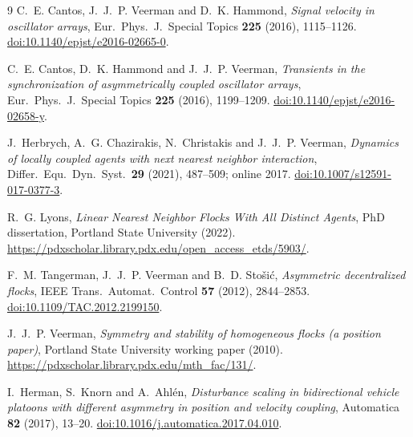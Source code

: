 \documentclass[11pt]{article}
\begin{document}
\begin{thebibliography}{9}
C.~E. Cantos, J.~J.~P. Veerman and D.~K. Hammond,
\emph{Signal velocity in oscillator arrays},
Eur.\ Phys.\ J.\ Special Topics \textbf{225} (2016), 1115--1126.
\href{https://doi.org/10.1140/epjst/e2016-02665-0}{doi:10.1140/epjst/e2016-02665-0}.

C.~E. Cantos, D.~K. Hammond and J.~J.~P. Veerman,
\emph{Transients in the synchronization of asymmetrically coupled oscillator arrays},
Eur.\ Phys.\ J.\ Special Topics \textbf{225} (2016), 1199--1209.
\href{https://doi.org/10.1140/epjst/e2016-02658-y}{doi:10.1140/epjst/e2016-02658-y}.

J.~Herbrych, A.~G. Chazirakis, N.~Christakis and J.~J.~P. Veerman,
\emph{Dynamics of locally coupled agents with next nearest neighbor interaction},
Differ.\ Equ.\ Dyn.\ Syst.\ \textbf{29} (2021), 487--509; online 2017.
\href{https://doi.org/10.1007/s12591-017-0377-3}{doi:10.1007/s12591-017-0377-3}.

R.~G. Lyons, \emph{Linear Nearest Neighbor Flocks With All Distinct Agents},
PhD dissertation, Portland State University (2022).
\url{https://pdxscholar.library.pdx.edu/open_access_etds/5903/}.

F.~M. Tangerman, J.~J.~P. Veerman and B.~D. Sto\v{s}i\'c,
\emph{Asymmetric decentralized flocks},
IEEE Trans.\ Automat.\ Control \textbf{57} (2012), 2844--2853.
\href{https://doi.org/10.1109/TAC.2012.2199150}{doi:10.1109/TAC.2012.2199150}.

J.~J.~P. Veerman,
\emph{Symmetry and stability of homogeneous flocks (a position paper)},
Portland State University working paper (2010).
\url{https://pdxscholar.library.pdx.edu/mth_fac/131/}.

I.~Herman, S.~Knorn and A.~Ahl\'en,
\emph{Disturbance scaling in bidirectional vehicle platoons with different
asymmetry in position and velocity coupling},
Automatica \textbf{82} (2017), 13--20.
\href{https://doi.org/10.1016/j.automatica.2017.04.010}{doi:10.1016/j.automatica.2017.04.010}.
\end{thebibliography}
\end{document}
